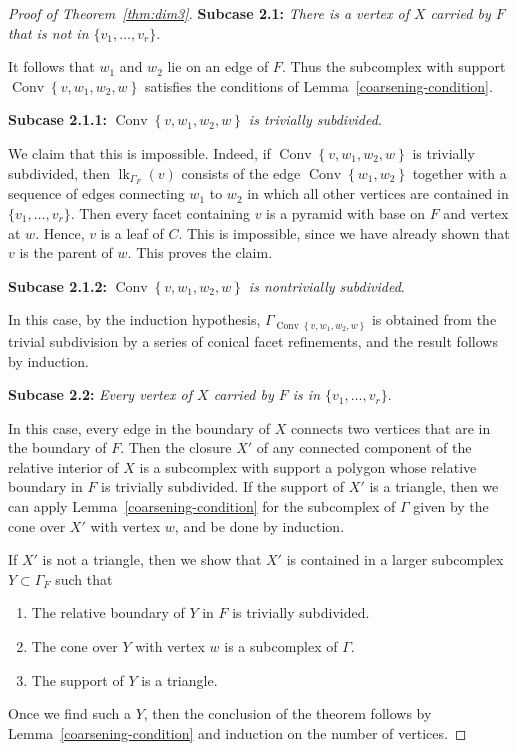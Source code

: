 \documentclass[10pt]{amsart}
\DeclareMathOperator{\Convop}{Conv}
\newcommand{\Conv}[1]{\Convop\left\{{#1}\right\}}
\DeclareMathOperator{\lk}{lk}
\newenvironment{proofsection}[2]{\par\smallskip\noindent\textbf{#1} \emph{#2}.\par\nobreak}{\par\smallskip}
\begin{document}
\begin{proof}[Proof of Theorem~\ref{thm:dim3}]
\begin{proofsection}{Subcase 2.1:} {There is a vertex of $X$ carried by $F$ that is not in $\{ v_1, \ldots, v_r \}$}
It follows that $w_1$ and $w_2$ lie on an edge of $F$. Thus the subcomplex with support $\Conv{v,w_1,w_2,w}$ satisfies the conditions of Lemma~\ref{coarsening-condition}. 
\end{proofsection}

\begin{proofsection}{Subcase 2.1.1:}{$\Conv{v,w_1,w_2,w}$ is trivially subdivided}

We claim that this is impossible. Indeed, if $\Conv{v,w_1,w_2,w}$ is trivially subdivided, then $\lk_{\Gamma_F}(v)$ consists of the edge $\Conv{w_1, w_2}$ together with a sequence of edges connecting $w_1$ to $w_2$ in which all other vertices are contained in $\{ v_1, \ldots, v_r \}$. Then every facet containing $v$ is a pyramid with base on $F$ and vertex at $w$. Hence, $v$ is a leaf of $C$. This is impossible, since we have already shown that $v$ is the parent of $w$. This proves the claim.
\end{proofsection}

\begin{proofsection}{Subcase 2.1.2:}{$\Conv{v,w_1,w_2,w}$ is nontrivially subdivided}

In this case, by the induction hypothesis, $\Gamma_{\Conv{v,w_1,w_2,w}}$ is obtained from the trivial subdivision by a series of conical facet refinements, and the result follows by induction.
\end{proofsection}

\begin{proofsection}{Subcase 2.2:}{Every vertex of $X$ carried by $F$ is in $\{v_1, \ldots, v_r\}$}

In this case, every edge in the boundary of $X$ connects two vertices that are in the boundary of $F$. Then the closure $X'$ of any connected component of the relative interior of $X$ is a subcomplex with support a polygon whose relative boundary in $F$ is trivially subdivided. If the support of $X'$ is a triangle, then we can apply Lemma~\ref{coarsening-condition} for the subcomplex of $\Gamma$ given by the cone over $X'$ with vertex $w$, and be done by induction.

If $X'$ is not a triangle, then we show that $X'$ is contained in a larger subcomplex $Y \subset \Gamma_F$ such that 
\begin{enumerate}
\item\label{subcase2.2_1} The relative boundary of $Y$ in $F$ is trivially subdivided.
\item\label{subcase2.2_2} The cone over $Y$ with vertex $w$ is a subcomplex of $\Gamma$.
\item\label{subcase2.2_3} The support of $Y$ is a triangle.
\end{enumerate}
Once we find such a $Y$, then the conclusion of the theorem follows by Lemma~\ref{coarsening-condition} and induction on the number of vertices.


\end{proofsection}
\end{proof}
\end{document}
